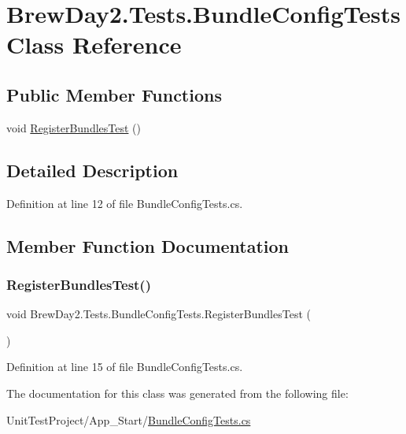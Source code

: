 \hypertarget{class_brew_day2_1_1_tests_1_1_bundle_config_tests}{}\section{Brew\+Day2.\+Tests.\+Bundle\+Config\+Tests Class Reference}
\label{class_brew_day2_1_1_tests_1_1_bundle_config_tests}
\subsection*{Public Member Functions}
\begin{DoxyCompactItemize}
\item 
void \mbox{\hyperlink{class_brew_day2_1_1_tests_1_1_bundle_config_tests_a0a40a1baffdf951cde3e68f8f4616833}{Register\+Bundles\+Test}} ()
\end{DoxyCompactItemize}


\subsection{Detailed Description}


Definition at line 12 of file Bundle\+Config\+Tests.\+cs.



\subsection{Member Function Documentation}
\mbox{\label{class_brew_day2_1_1_tests_1_1_bundle_config_tests_a0a40a1baffdf951cde3e68f8f4616833}} 
\subsubsection{\texorpdfstring{Register\+Bundles\+Test()}{RegisterBundlesTest()}}
{\footnotesize\ttfamily void Brew\+Day2.\+Tests.\+Bundle\+Config\+Tests.\+Register\+Bundles\+Test (\begin{DoxyParamCaption}{ }\end{DoxyParamCaption})}



Definition at line 15 of file Bundle\+Config\+Tests.\+cs.



The documentation for this class was generated from the following file\+:\begin{DoxyCompactItemize}
\item 
Unit\+Test\+Project/\+App\+\_\+\+Start/\mbox{\hyperlink{_bundle_config_tests_8cs}{Bundle\+Config\+Tests.\+cs}}\end{DoxyCompactItemize}
